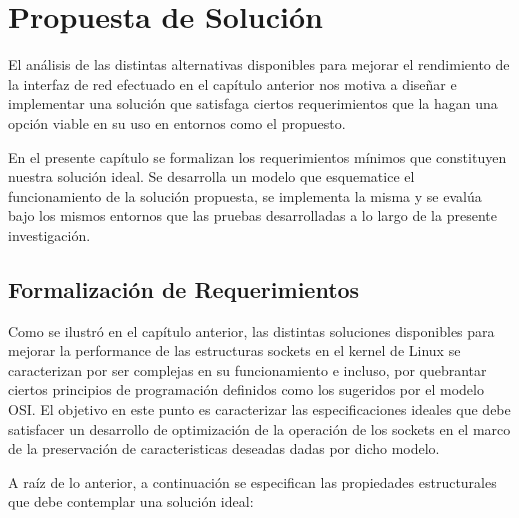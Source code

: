 \chapter{Propuesta de Solución}
El análisis de las distintas alternativas disponibles para mejorar el rendimiento de la interfaz de red efectuado en el capítulo anterior nos motiva a diseñar e implementar una solución que satisfaga ciertos requerimientos que la hagan una opción viable en su uso en entornos como el propuesto.

En el presente capítulo se formalizan los requerimientos mínimos que constituyen nuestra solución ideal. Se desarrolla un modelo que esquematice el funcionamiento de la solución propuesta, se implementa la misma y se evalúa bajo los mismos entornos que las pruebas desarrolladas a lo largo de la presente investigación.

\section{Formalización de Requerimientos}
Como se ilustró en el capítulo anterior, las distintas soluciones disponibles para mejorar la performance de las estructuras sockets en el kernel de Linux se caracterizan por ser complejas en su funcionamiento e incluso, por quebrantar ciertos principios de programación definidos como los sugeridos por el modelo OSI. El objetivo en este punto es caracterizar las especificaciones ideales que debe satisfacer un desarrollo de optimización de la operación de los sockets en el marco de la preservación de caracteristicas deseadas dadas por dicho modelo.

A raíz de lo anterior, a continuación se especifican las propiedades estructurales que debe contemplar una solución ideal:


